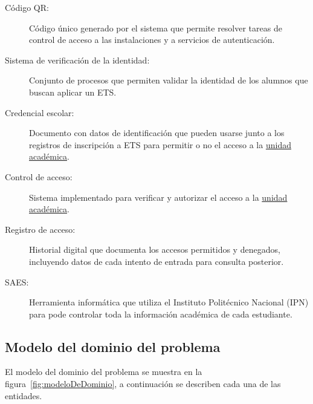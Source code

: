 \begin{description}
	\item[\hypertarget{tCodigoQR}{Código QR:}] Código único generado por el sistema que permite resolver tareas de control de acceso a las instalaciones y a servicios de autenticación.
	
	\item[\hypertarget{tSistemaVerificacion}{Sistema de verificación de la identidad:}] Conjunto de procesos que permiten validar la identidad de los alumnos que buscan aplicar un ETS.
	
	\item[\hypertarget{tCredencialEscolar}{Credencial escolar:}] Documento con datos de identificación que pueden usarse junto a los registros de inscripción a ETS para permitir o no el acceso a la \hyperlink{tUnidadAcademica}{unidad académica}.
	
	\item[\hypertarget{tControlAcceso}{Control de acceso:}] Sistema implementado para verificar y autorizar el acceso a la \hyperlink{tUnidadAcademica}{unidad académica}.
	
	\item[\hypertarget{tRegistroAcceso}{Registro de acceso:}] Historial digital que documenta los accesos permitidos y denegados, incluyendo datos de cada intento de entrada para consulta posterior.
	
	\item[\hypertarget{tSAES}{SAES:}] Herramienta informática que utiliza el Instituto Politécnico Nacional (IPN) para pode controlar toda la información académica de cada estudiante.
	
\end{description}


\subsection{Modelo del dominio del problema}
\label{sec:modeloDeDominioP}

El modelo del dominio del problema se muestra en la figura~\ref{fig:modeloDeDominio}, a continuación se describen cada una de las entidades.

\newpage

